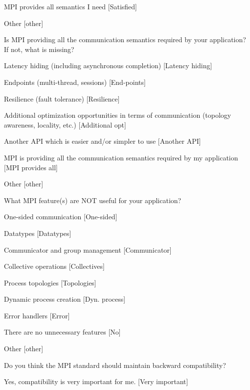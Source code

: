 \documentclass[preprint,5p,times]{elsarticle}
\begin{document}
{\begin{description}
\begin{inparaenum}[{\bf C}1)]
    \item MPI provides all semantics I need [Satisfied]
    \item Other [other]
    \end{inparaenum}
  \item[Q26*:] Is MPI providing all the communication semantics required
    by your application? If not, what is missing?
    \begin{inparaenum}[{\bf C}1)]
    \item Latency hiding (including asynchronous completion) [Latency hiding]
    \item Endpoints (multi-thread, sessions) [End-points]
    \item Resilience (fault tolerance) [Resilience]
    \item Additional optimization opportunities in terms of communication
      (topology awareness, locality, etc.) [Additional opt]
    \item Another API which is easier and/or simpler to use [Another API]
    \item MPI is providing all the communication semantics required by my
      application [MPI provides all]
    \item Other [other]
    \end{inparaenum}
  \item[Q27*:] What MPI feature(s) are NOT useful for your application?
    \begin{inparaenum}[{\bf C}1)]
    \item One-sided communication [One-sided]
    \item Datatypes [Datatypes]
    \item Communicator and group management [Communicator]
    \item Collective operations [Collectives]
    \item Process topologies [Topologies]
    \item Dynamic process creation [Dyn. process]
    \item Error handlers [Error]
    \item There are no unnecessary features [No]
    \item Other [other]
    \end{inparaenum}
  \item[Q28:] Do you think the MPI standard should maintain backward
    compatibility?
    \begin{inparaenum}[{\bf C}1)]
    \item Yes, compatibility is very important for me. [Very important]

\end{inparaenum}
\end{description}}
\end{document}
